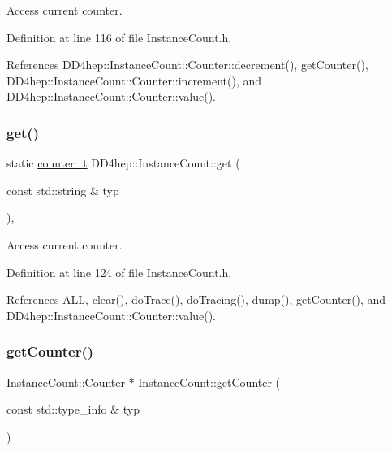 Access current counter. 



Definition at line 116 of file Instance\+Count.\+h.



References D\+D4hep\+::\+Instance\+Count\+::\+Counter\+::decrement(), get\+Counter(), D\+D4hep\+::\+Instance\+Count\+::\+Counter\+::increment(), and D\+D4hep\+::\+Instance\+Count\+::\+Counter\+::value().

\hypertarget{struct_d_d4hep_1_1_instance_count_aecb1277df454b018fc8144635c3dcb24}{}\label{struct_d_d4hep_1_1_instance_count_aecb1277df454b018fc8144635c3dcb24} 
\subsubsection{\texorpdfstring{get()}{get()}\hspace{0.1cm}{\footnotesize\ttfamily [3/3]}}
{\footnotesize\ttfamily static \hyperlink{struct_d_d4hep_1_1_instance_count_ae81dc0c76b135425e14b6dc38262a727}{counter\+\_\+t} D\+D4hep\+::\+Instance\+Count\+::get (\begin{DoxyParamCaption}\item[{const std\+::string \&}]{typ }\end{DoxyParamCaption})\hspace{0.3cm}{\ttfamily [inline]}, {\ttfamily [static]}}



Access current counter. 



Definition at line 124 of file Instance\+Count.\+h.



References A\+LL, clear(), do\+Trace(), do\+Tracing(), dump(), get\+Counter(), and D\+D4hep\+::\+Instance\+Count\+::\+Counter\+::value().

\hypertarget{struct_d_d4hep_1_1_instance_count_a439db48975fe6b4e193a7ff40bc96bc6}{}\label{struct_d_d4hep_1_1_instance_count_a439db48975fe6b4e193a7ff40bc96bc6} 
\subsubsection{\texorpdfstring{get\+Counter()}{getCounter()}\hspace{0.1cm}{\footnotesize\ttfamily [1/2]}}
{\footnotesize\ttfamily \hyperlink{class_d_d4hep_1_1_instance_count_1_1_counter}{Instance\+Count\+::\+Counter} $\ast$ Instance\+Count\+::get\+Counter (\begin{DoxyParamCaption}\item[{const std\+::type\+\_\+info \&}]{typ }\end{DoxyParamCaption})\hspace{0.3cm}{\ttfamily [static]}}



